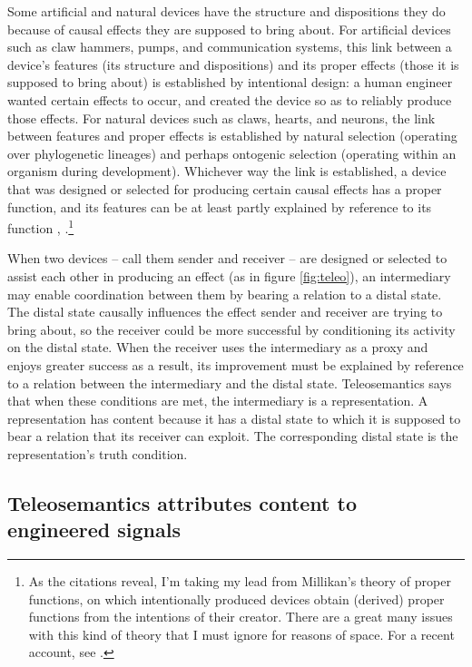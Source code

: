 \documentclass[12pt]{article}
\begin{document}
Some artificial and natural devices have the structure and dispositions they do because of causal effects they are supposed to bring about.
For artificial devices such as claw hammers, pumps, and communication systems, this link between a device's features (its structure and dispositions) and its proper effects (those it is supposed to bring about) is established by intentional design: a human engineer wanted certain effects to occur, and created the device so as to reliably produce those effects.
For natural devices such as claws, hearts, and neurons, the link between features and proper effects is established by natural selection (operating over phylogenetic lineages) and perhaps ontogenic selection (operating within an organism during development).
Whichever way the link is established, a device that was designed or selected for producing certain causal effects has a proper function, and its features can be at least partly explained by reference to its function \citep[$\S\S$1-2]{millikan1984language}, \citep[$\S$2]{millikan1993white}.\footnote{As the citations reveal, I'm taking my lead from Millikan's theory of proper functions, on which intentionally produced devices obtain (derived) proper functions from the intentions of their creator. There are a great many issues with this kind of theory that I must ignore for reasons of space. For a recent account, see \citet{garson2019what}.}

When two devices -- call them sender and receiver -- are designed or selected to assist each other in producing an effect (as in figure \ref{fig:teleo}), an intermediary may enable coordination between them by bearing a relation to a distal state.
The distal state causally influences the effect sender and receiver are trying to bring about, so the receiver could be more successful by conditioning its activity on the distal state.
When the receiver uses the intermediary as a proxy and enjoys greater success as a result, its improvement must be explained by reference to a relation between the intermediary and the distal state.
Teleosemantics says that when these conditions are met, the intermediary is a representation.
A representation has content because it has a distal state to which it is supposed to bear a relation that its receiver can exploit.
The corresponding distal state is the representation's truth condition.


\subsection{Teleosemantics attributes content to engineered signals}
\end{document}
